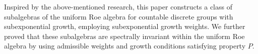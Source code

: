 \documentclass[preprint,11pt]{elsarticle}
\numberwithin{equation}{section}
\begin{document}
	
	
	
	Inspired by the above-mentioned research, this paper constructs a class of  subalgebras of the uniform Roe algebra for countable discrete groups with subexponential growth, employing subexponential growth weights.
	We further proved that these subalgebras are spectrally invariant within the uniform Roe algebra by using admissible weights and growth conditions satisfying property $P$.  
	
\end{document}

